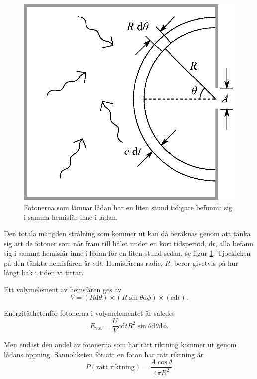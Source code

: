 \begin{figure}[hpbt]
\centering
\includegraphics[height=0.3\textheight]{images/blackbody_box.eps}
\caption{\label{fig:box}{Fotonerna som lämnar lådan har en liten stund tidigare befunnit sig i samma hemisfär inne i lådan.}}
\end{figure}

Den totala mängden strålning som kommer ut kan då beräknas genom att tänka sig att 
de fotoner som når fram till hålet under en kort tidsperiod, $\mathrm{d}t$, alla befann sig
 i samma hemisfär inne i lådan för en liten stund sedan, se figur \ref{fig:box}. Tjockleken 
 på den tänkta hemisfären är $c\mathrm{d}t$. Hemisfärens radie, $R$, beror givetvis på 
 hur långt bak i tiden vi tittar.

Ett volymelement av hemsfären ges av
\begin{equation}
V=(R\mathrm{d}\theta) \times (R\sin\theta\mathrm{d}\phi) \times (c \mathrm{d}t).
\end{equation}

Energitäthetenför fotonerna i volymelementet är således
\begin{equation}
E_\text{v.e.}=\frac{U}{V} c \mathrm{d}t R^2 \sin\theta \mathrm{d}\theta \mathrm{d}\phi.
\end{equation}

Men endast den andel av fotonerna som har rätt riktning kommer ut genom lådans öppning. Sannoliketen för att en foton har rätt riktning är
\begin{equation}
P(\text{rätt riktning})=\frac{A\cos\theta}{4\pi R^2}
\end{equation}

